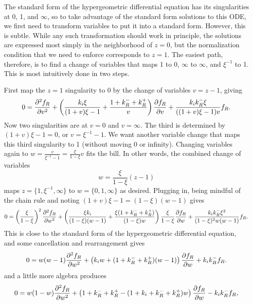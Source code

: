 The standard form of the hypergeometric differential equation has its
singularities at 0, 1, and $\infty$, so to take advantage of the standard form
solutions to this ODE, we first need to transform variables to put it into a
standard form. However, this is subtle. While any such transformation should
work in principle, the solutions are expressed most simply in the neighborhood
of $z=0$, but the normalization condition that we need to enforce corresponds to
$z=1$. The easiest path, therefore, is to find a change of variables that maps 1
to 0, $\infty$ to $\infty$, and $\xi^{-1}$ to 1. This is most intuitively done
in two steps.

First map the $z=1$ singularity to 0 by the change of variables $v=z-1$, giving
\begin{equation}
0 = \psecderiv[f_R]{v}
        + \left(\frac{k_i\xi}{(1+v)\xi - 1}
                + \frac{1 + k_R^- + k_R^+}{v}
        \right)\pderiv[f_R]{v}
        + \frac{k_i k_R^- \xi}{((1+v)\xi - 1)v}f_R.
\end{equation}
Now two singularities are at $v=0$ and $v=\infty$. The third is determined by
$(1+v)\xi -1 = 0$, or $v=\xi^{-1} - 1$. We want another variable change that
maps this third singularity to 1 (without moving 0 or infinity). Changing
variables again to $w=\frac{v}{\xi^{-1} - 1} = \frac{\xi}{1-\xi} v$ fits the
bill. In other words, the combined change of variables
\begin{equation}
w = \frac{\xi}{1-\xi} (z-1)
\end{equation}
maps $z = \{1, \xi^{-1}, \infty\}$ to $w =\{0, 1, \infty\}$ as desired. Plugging
in, being mindful of the chain rule and noting
$(1 + v)\xi - 1 = (1 - \xi)(w - 1)$ gives
\begin{equation}
0 = \left(\frac{\xi}{1-\xi}\right)^2 \psecderiv[f_R]{w}
+ \left(
        \frac{\xi k_i}{(1-\xi)(w-1)} + \frac{\xi(1 + k_R^- + k_R^+)}{(1-\xi)w}
\right) \frac{\xi}{1-\xi} \pderiv[f_R]{w}
+ \frac{k_i k_R^- \xi^2}{(1-\xi)^2 w(w-1)}f_R.
\end{equation}
This is close to the standard form of the hypergeometric differential equation,
and some cancellation and rearrangement gives
\begin{equation}
0 = w(w-1)\psecderiv[f_R]{w}
+ \left(k_i w + (1 + k_R^- + k_R^+)(w-1)\right) \pderiv[f_R]{w}
+ k_i k_R^- f_R.
\end{equation}
and a little more algebra produces
\begin{equation}
0 = w(1-w)\psecderiv[f_R]{w}
+ \left(1 + k_R^- + k_R^+
        - (1 + k_i + k_R^- + k_R^+)w
\right) \pderiv[f_R]{w}
- k_i k_R^- f_R,
\end{equation}
